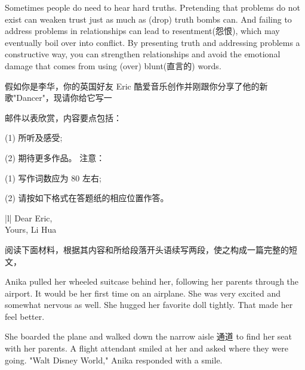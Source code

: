 \documentclass{英语试卷}
\begin{document}
\par Sometimes people do need to hear hard truths. Pretending that problems do not exist can weaken trust just as much as  (drop) truth bombs can. And failing to address problems in relationships can lead to resentment(怨恨), which may eventually boil over into conflict. By presenting truth and addressing problems  a constructive way, you can strengthen relationships and avoid the emotional damage that comes from using  (over) blunt(直言的) words.\par
{}
\par 假如你是李华，你的英国好友 Eric 酷爱音乐创作并刚跟你分享了他的新歌"Dancer"，现请你给它写一\par
\par 邮件以表欣赏，内容要点包括：\par
\par (1) 所听及感受;\par
\par (2) 期待更多作品。 注意：\par
\par (1) 写作词数应为 80 左右;\par
\par (2) 请按如下格式在答题纸的相应位置作答。\par
\par\vspace{0.4em}
\begin{center}\begin{tabular}{{|l|}}
\hline
Dear Eric, \\
Yours, Li Hua \\
\hline
\end{tabular}\end{center}
\vspace{0.4em}
\par 阅读下面材料，根据其内容和所给段落开头语续写两段，使之构成一篇完整的短文，\par
\par Anika pulled her wheeled suitcase behind her, following her parents through the airport. It would be her first time on an airplane. She was very excited and somewhat nervous as well. She hugged her favorite doll tightly. That made her feel better.\par
\par She boarded the plane and walked down the narrow aisle 通道 to find her seat with her parents. A flight attendant smiled at her and asked where they were going. "Walt Disney World," Anika responded with a smile.\par
\end{document}
